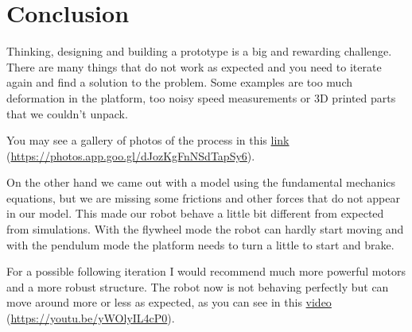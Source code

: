 \section{Conclusion}
Thinking, designing and building a prototype is a big and rewarding challenge.
There are many things that do not work as expected and you need to iterate again
and find a solution to the problem. Some examples are too much deformation in the platform,
too noisy speed measurements or 3D printed parts that we couldn't unpack.

You may see a gallery of photos
of the process in this \href{https://photos.app.goo.gl/dJozKgFnNSdTapSy6}{link} (\href{https://photos.app.goo.gl/dJozKgFnNSdTapSy6}{https://photos.app.goo.gl/dJozKgFnNSdTapSy6}).

On the other hand we came out with a model using the fundamental mechanics equations, but we are missing
some frictions and other forces that do not appear in our model. This made our robot behave a little bit
different from expected from simulations. With the flywheel mode the robot can hardly start moving and with
the pendulum mode the platform needs to turn a little to start and brake.

For a possible following iteration I would recommend much more powerful motors and a more robust structure.
The robot now is not behaving perfectly but can move around more or less as expected, as you can see in this
\href{https://youtu.be/yWOlyIL4cP0}{video} (\href{https://youtu.be/yWOlyIL4cP0}{https://youtu.be/yWOlyIL4cP0}).